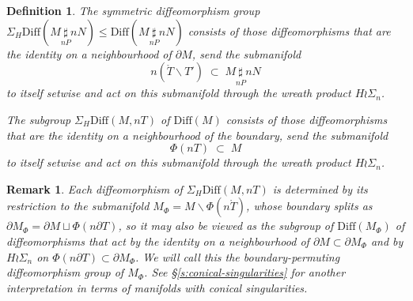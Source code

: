 \documentclass[reqno,a4paper]{article}
\numberwithin{equation}{section}
\theoremstyle{italicised}
\theoremstyle{upright}
\newtheorem{defn}[thm]{Definition}
\newtheorem{rmk}[thm]{Remark}
\theoremstyle{italicised-restate}
\renewcommand{\leq}{\leqslant}
\begin{document}
\begin{defn}\label{d:symm-diff-group}
The \emph{symmetric diffeomorphism group} $\Sigma_H \mathrm{Diff}(M \underset{nP}{\sharp} nN) \leq \mathrm{Diff}(M \underset{nP}{\sharp} nN)$ consists of those diffeomorphisms that are the identity on a neighbourhood of $\partial M$, send the submanifold
\[
n(\mathring{T} \smallsetminus T') \;\subset\; M \underset{nP}{\sharp} nN
\]
to itself setwise and act on this submanifold through the wreath product $H \wr \Sigma_n$.

The subgroup $\Sigma_H \mathrm{Diff}(M,nT)$ of $\mathrm{Diff}(M)$ consists of those diffeomorphisms that are the identity on a neighbourhood of the boundary, send the submanifold
\[
\Phi(nT) \;\subset\; M
\]
to itself setwise and act on this submanifold through the wreath product $H \wr \Sigma_n$.
\end{defn}

\begin{rmk}\label{r:mphi}
Each diffeomorphism of $\Sigma_H \mathrm{Diff}(M,nT)$ is determined by its restriction to the submanifold $M_\Phi = M \smallsetminus \Phi(n\mathring{T})$, whose boundary splits as $\partial M_\Phi = \partial M \sqcup \Phi(n\partial T)$, so it may also be viewed as the subgroup of $\mathrm{Diff}(M_\Phi)$ of diffeomorphisms that act by the identity on a neighbourhood of $\partial M \subset \partial M_\Phi$ and by $H \wr \Sigma_n$ on $\Phi(n\partial T) \subset \partial M_\Phi$. We will call this the \emph{boundary-permuting diffeomorphism group} of $M_\Phi$. See \S\ref{s:conical-singularities} for another interpretation in terms of manifolds with conical singularities.
\end{rmk}
\end{document}
